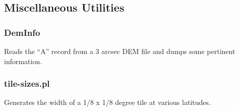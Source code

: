 \documentclass[12pt]{article}
\begin{document}
\subsection{Miscellaneous Utilities}

\subsubsection{DemInfo}

Reads the ``A'' record from a 3 arcsec DEM file and dumps some
pertinent information.

\subsubsection{tile-sizes.pl}

Generates the width of a 1/8 x 1/8 degree tile at various latitudes.
\end{document}
